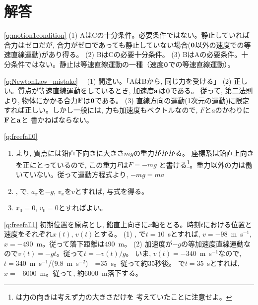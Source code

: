 \section{解答}

\ref{q:motion1condition}
(1) AはCの十分条件。必要条件ではない。静止していれば合力はゼロだが, 
合力がゼロであっても静止していない場合(${\bf 0}$以外の速度での等速直線運動)があり得る。
(2) BはCの必要十分条件。
(3) BはAの必要条件。十分条件ではない。静止は等速直線運動の一種（速度${\bf 0}$での等速直線運動）。
\mv



\ref{q:NewtonLaw_mistake}　
(1) 間違い。「AはBから, 同じ力を受ける」
(2) 正しい。質点が等速直線運動をしているとき, 加速度${\bf a}$は${\bf 0}$である。
従って, 第二法則より, 物体にかかる合力${\bf F}$は${\bf 0}$である。
(3) 直線方向の運動(1次元の運動)に限定すれば正しい。しかし一般には, 
力も加速度もベクトルなので, $F$と$a$のかわりに${\bf F}$と${\bf a}$と
書かねばならない。
\mv


\ref{q:freefall0}
\begin{enumerate}
\item {}より, 質点には鉛直下向きに大きさ$mg$の重力がかかる。
座標系は鉛直上向きを正にとっているので, この重力$F$は$F=-mg$
と書ける\footnote{は力の向きは考えず力の大きさだけを
考えていたことに注意せよ。}。重力以外の力は働いていない。従って運動方程式より, 
$-mg=ma$
\item {}, で, $a_x$を$-g$, $v_x$を$v$とすれば, 与式を得る。
\item $x_0=0$, $v_0=0$とすればよい。
\end{enumerate}
\mv


\ref{q:freefall1} 初期位置を原点とし, 鉛直上向きに$x$軸をとる。時刻$t$における位置と速度をそれぞれ$x(t)$, $v(t)$とする。
(1) , で$t=10$~sとすれば, $v=-98$~m~s$^{-1}$, $x=-490$~m。従って落下距離は490~m。
(2) 加速度が$-g$の等加速度直線運動なので$v(t)=-gt$。従って$t=-v(t)/g$。
いま, $v(t)=-340$~m~s$^{-1}$なので, $t=340$~m~s$^{-1}$/(9.8~m~s$^{-2}$)　=35~s。従って約35秒後。
で$t=35$~sとすれば, $x=-6000$~m。従って, 約6000~m落下する。
\vspace{0.2cm}


